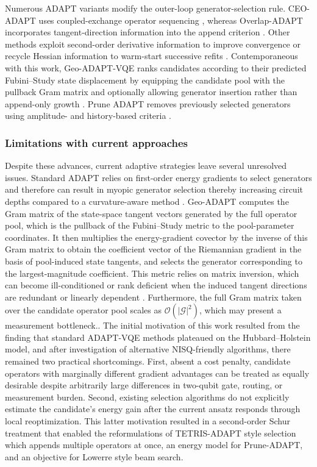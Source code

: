 \documentclass[
  reprint,
  amsmath,
  amssymb,
  aps,
  pra,
  nofootinbib,
  superscriptaddress,
  floatfix
]{revtex4-2}
\begin{document}
Numerous ADAPT variants modify the outer-loop generator-selection rule. CEO-ADAPT uses coupled-exchange operator sequencing \cite{Ramoa2025}, whereas Overlap-ADAPT incorporates tangent-direction information into the append criterion \cite{Feniou2023}. Other methods exploit second-order derivative information to improve convergence \cite{Grimsley2023ADAPT} or recycle Hessian information to warm-start successive refits \cite{Ramoa2025HessianRecycling}. Contemporaneous with this work, Geo-ADAPT-VQE ranks candidates according to their predicted Fubini--Study state displacement by equipping the candidate pool with the pullback Gram matrix and optionally allowing generator insertion rather than append-only growth \cite{Sohail2026GeoADAPT}. Prune ADAPT removes previously selected generators using amplitude- and history-based criteria \cite{Vaquero2025PrunedADAPT}.

\subsubsection{Limitations with current approaches}
Despite these advances, current adaptive strategies leave several unresolved issues. Standard ADAPT relies on first-order energy gradients to select generators \cite{Grimsley2019,Tang2021,Yordanov2021} and therefore can result in myopic generator selection thereby increasing circuit depths compared to a curvature-aware method \cite{Feniou2023,Grimsley2023ADAPT}. Geo-ADAPT computes the Gram matrix of the state-space tangent vectors generated by the full operator pool, which is the pullback of the Fubini--Study metric to the pool-parameter coordinates. It then multiplies the energy-gradient covector by the inverse of this Gram matrix to obtain the coefficient vector of the Riemannian gradient in the basis of pool-induced state tangents, and selects the generator corresponding to the largest-magnitude coefficient. This metric relies on matrix inversion, which can become ill-conditioned or rank deficient when the induced tangent directions are redundant or linearly dependent \cite{Sohail2026GeoADAPT}. Furthermore, the full Gram matrix taken over the candidate operator pool scales as $\mathcal{O}(|\mathcal{G}|^2)$, which may present a measurement bottleneck.\cite{Ramoa2025HessianRecycling,Ikhtiarudin2025ShotEfficient}. 
\noindent
The initial motivation of this work resulted from the finding that standard ADAPT-VQE methods plateaued on the Hubbard--Holstein model, and after investigation of alternative NISQ-friendly algorithms, there remained two practical shortcomings. First, absent a cost penalty, candidate operators with marginally different gradient advantages can be treated as equally desirable despite arbitrarily large differences in two-qubit gate, routing, or measurement burden. Second, existing selection algorithms do not explicitly estimate the candidate's energy gain after the current ansatz responds through local reoptimization. This latter motivation resulted in a second-order Schur treatment that enabled the reformulations of TETRIS-ADAPT style selection which appends multiple operators at once, an energy model for Prune-ADAPT, and an objective for Lowerre style beam search.
\end{document}
